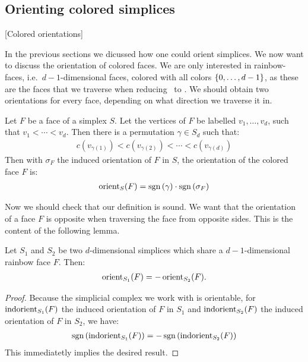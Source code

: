 \subsection{Orienting colored simplices}[Colored orientations]

In the previous sections we dicussed how one could orient simplices. We now want to discuss the orientation of colored faces. We are only interested in rainbow-faces, i.e.~$d-1$-dimensional faces, colored with all colors $\left\{0, \dots, d-1\right\}$, as these are the faces that we traverse when reducing \Sperner\ to \EndOfLine. We should obtain two orientations for every face, depending on what direction we traverse it in.

\begin{definition}
	Let $F$ be a face of a simplex $S$. Let the vertices of $F$ be labelled $v_1, \dots, v_d$, such that $v_1 < \cdots < v_d$. Then there is a permutation $\gamma \in S_d$ such that:
	\begin{align*}
		c(v_{\gamma(1)}) < c(v_{\gamma(2)}) < \cdots < c(v_{\gamma(d)})
	\end{align*}
	Then with $\sigma_F$ the induced orientation of $F$ in $S$, the orientation of the colored face $F$ is:
	\begin{align*}
		\operatorname{orient}_S(F) = \operatorname{sgn}\left(\gamma\right) \cdot \operatorname{sgn}\left(\sigma_F\right)
	\end{align*}
\end{definition}

Now we should check that our definition is sound. We want that the orientation of a face $F$ is opposite when traversing the face from opposite sides. This is the content of the following lemma.

\begin{lemma}
	\label{lem:soundness_of_colored_orientability}
	Let $S_1$ and $S_2$ be two $d$-dimensional simplices which share a $d-1$-dimensional rainbow face $F$. Then:
	\begin{align*}
		\operatorname{orient}_{S_1}(F) = - \operatorname{orient}_{S_2}(F).
	\end{align*}
\end{lemma}
\begin{proof}
	Because the simplicial complex we work with is orientable, for $\operatorname{indorient}_{S_1}(F)$ the induced orientation of $F$ in $S_1$ and $\operatorname{indorient}_{S_2}(F)$ the induced orientation of $F$ in $S_2$, we have:
	\begin{align*}
		\operatorname{sgn}\left(\operatorname{indorient}_{S_1}(F)\right) = - \operatorname{sgn}\left(\operatorname{indorient}_{S_2}(F)\right)
	\end{align*}
	This immediatetly implies the desired result.
\end{proof}

